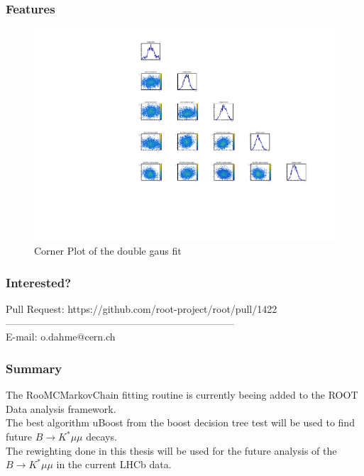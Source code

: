 \documentclass{beamer}
\begin{document}
\begin{frame}
 \frametitle{Features}

 \begin{figure}
  \includegraphics[width=0.8\linewidth]{figures/twogausCorner}
  \caption{Corner Plot of the double gaus fit}
 \end{figure}

\end{frame}

\begin{frame}
 \frametitle{Interested?}


   \centering Pull Request: https://github.com/root-project/root/pull/1422 \\
    --------------------------------------------------------------------- \\
   \centering E-mail: o.dahme@cern.ch

\end{frame}

\begin{frame}
 \frametitle{Summary}

The RooMCMarkovChain fitting routine is currently beeing added to the ROOT Data analysis framework. \\
 The best algorithm uBoost from the boost decision tree test will be used to find future $B \rightarrow K^* \mu \mu$ decays. \\
 The rewighting done in this thesis will be used for the future analysis of the $B \rightarrow K^* \mu \mu$ in the current LHCb data.

\end{frame}
\end{document}
